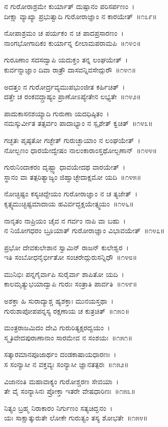 ನ ಗುರೋರಾಶ್ರಮೇ ಕುರ್ಯಾತ್ ದುಷ್ಪಾನಂ ಪರಿಸರ್ಪಣಂ~।\\
ದೀಕ್ಷಾ ವ್ಯಾಖ್ಯಾ ಪ್ರಭುತ್ವಾದಿ ಗುರೋರಾಜ್ಞಾಂ ನ ಕಾರಯೇತ್~॥೧೩೯॥

ನೋಪಾಶ್ರಮಂ ಚ ಪರ್ಯಕಂ ನ ಚ ಪಾದಪ್ರಸಾರಣಂ~।\\
ನಾಂಗಭೋಗಾದಿಕಂ ಕುರ್ಯಾನ್ನ ಲೀಲಾಮಪರಾಮಪಿ~॥೧೪೦॥

ಗುರೂಣಾಂ ಸದಸದ್ವಾಪಿ ಯದುಕ್ತಂ ತನ್ನ ಲಂಘಯೇತ್~।\\
ಕುರ್ವನ್ನಾಜ್ಞಾಂ ದಿವಾ ರಾತ್ರೌ ದಾಸವನ್ನಿವಸೇದ್ಗುರೌ~॥೧೪೧॥

ಅದತ್ತಂ ನ ಗುರೋರ್ದ್ರವ್ಯಮುಪಭುಂಜೀತ ಕರ್ಹಿಚಿತ್~।\\
ದತ್ತೇ ಚ ರಂಕವದ್ಗ್ರಾಹ್ಯಂ ಪ್ರಾಣೋಽಪ್ಯೇತೇನ ಲಭ್ಯತೇ~॥೧೪೨॥

ಪಾದುಕಾಸನಶಯ್ಯಾದಿ ಗುರುಣಾ ಯದಧಿಷ್ಠಿತಂ~।\\
ನಮಸ್ಕುರ್ವೀತ ತತ್ಸರ್ವಂ ಪಾದಾಭ್ಯಾಂ ನ ಸ್ಪೃಶೇತ್ ಕ್ವಚಿತ್~॥೧೪೩॥

ಗಚ್ಛತಃ ಪೃಷ್ಠತೋ ಗಚ್ಛೇತ್ ಗುರುಚ್ಛಾಯಾಂ ನ ಲಂಘಯೇತ್~।\\
ನೋಲ್ಬಣಂ ಧಾರಯೇದ್ವೇಷಂ ನಾಲಂಕಾರಾಂಸ್ತಥೋಲ್ಬಣಾನ್~॥೧೪೪॥

ಗುರುನಿಂದಾಕರಂ ದೃಷ್ಟ್ವಾ ಧಾವಯೇದಥ ವಾರಯೇತ್~।\\
ಸ್ಥಾನಂ ವಾ ತತ್ಪರಿತ್ಯಾಜ್ಯಂ ಜಿಹ್ವಾಚ್ಛೇದಾಕ್ಷಮೋ ಯದಿ~॥೧೪೫॥

ನೋಚ್ಛಿಷ್ಟಂ ಕಸ್ಯಚಿದ್ದೇಯಂ ಗುರೋರಾಜ್ಞಾಂ ನ ಚ ತ್ಯಜೇತ್~।\\
ಕೃತ್ಸ್ನಮುಚ್ಛಿಷ್ಟಮಾದಾಯ ಹವಿರ್ವದ್ಭಕ್ಷಯೇತ್ಸ್ವಯಂ~॥೧೪೬॥

ನಾನೃತಂ ನಾಪ್ರಿಯಂ ಚೈವ ನ ಗರ್ವಂ ನಾಪಿ ವಾ ಬಹು~।\\
ನ ನಿಯೋಗಧರಂ ಬ್ರೂಯಾತ್ ಗುರೋರಾಜ್ಞಾಂ ವಿಭಾವಯೇತ್~॥೧೪೭॥

ಪ್ರಭೋ ದೇವಕುಲೇಶಾನ ಸ್ವಾಮಿನ್ ರಾಜನ್ ಕುಲೇಶ್ವರ~।\\
ಇತಿ ಸಂಬೋಧನೈರ್ಭೀತೋ ಸಂಚರೇದ್ಗುರುಸನ್ನಿಧೌ~॥೧೪೮॥

ಮುನಿಭಿಃ ಪನ್ನಗೈರ್ವಾಪಿ ಸುರೈರ್ವಾ ಶಾಪಿತೋ ಯದಿ~।\\
ಕಾಲಮೃತ್ಯುಭಯಾದ್ವಾಪಿ ಗುರುಃ ಸಂತ್ರಾತಿ ಪಾರ್ವತಿ~॥೧೪೯॥

ಅಶಕ್ತಾ ಹಿ ಸುರಾದ್ಯಾಶ್ಚ ಹ್ಯಶಕ್ತಾಃ ಮುನಯಸ್ತಥಾ~।\\
ಗುರುಶಾಪೋಪಪನ್ನಸ್ಯ ರಕ್ಷಣಾಯ ಚ ಕುತ್ರಚಿತ್~॥೧೫೦॥

ಮಂತ್ರರಾಜಮಿದಂ ದೇವಿ ಗುರುರಿತ್ಯಕ್ಷರದ್ವಯಂ~।\\
ಸ್ಮೃತಿವೇದಪುರಾಣಾನಾಂ ಸಾರಮೇವ ನ ಸಂಶಯಃ~॥೧೫೧॥

ಸತ್ಕಾರಮಾನಪೂಜಾರ್ಥಂ ದಂಡಕಾಷಾಯಧಾರಣಃ~।\\
ಸ ಸಂನ್ಯಾಸೀ ನ ವಕ್ತವ್ಯಃ ಸಂನ್ಯಾಸೀ ಜ್ಞಾನತತ್ಪರಃ~॥೧೫೨॥

ವಿಜಾನಂತಿ ಮಹಾವಾಕ್ಯಂ ಗುರೋಶ್ಚರಣ ಸೇವಯಾ~।\\
ತೇ ವೈ ಸಂನ್ಯಾಸಿನಃ ಪ್ರೋಕ್ತಾ ಇತರೇ ವೇಷಧಾರಿಣಃ~॥೧೫೩॥

ನಿತ್ಯಂ ಬ್ರಹ್ಮ ನಿರಾಕಾರಂ ನಿರ್ಗುಣಂ ಸತ್ಯಚಿದ್ಘನಂ~।\\
ಯಃ ಸಾಕ್ಷಾತ್ಕುರುತೇ ಲೋಕೇ ಗುರುತ್ವಂ ತಸ್ಯ ಶೋಭತೇ~॥೧೫೪॥

